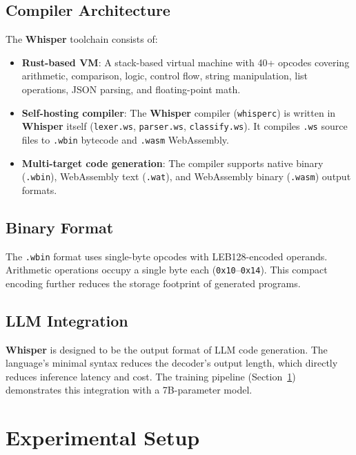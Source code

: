 \documentclass[11pt,a4paper]{article}
\begin{document}
\subsection{Compiler Architecture}

The \textbf{Whisper} toolchain consists of:

\begin{itemize}
\item \textbf{Rust-based VM}: A stack-based virtual machine with 40+ opcodes
  covering arithmetic, comparison, logic, control flow, string manipulation,
  list operations, JSON parsing, and floating-point math.
\item \textbf{Self-hosting compiler}: The \textbf{Whisper} compiler
  (\texttt{whisperc}) is written in \textbf{Whisper} itself (\texttt{lexer.ws},
  \texttt{parser.ws}, \texttt{classify.ws}). It compiles \texttt{.ws} source
  files to \texttt{.wbin} bytecode and \texttt{.wasm} WebAssembly.
\item \textbf{Multi-target code generation}: The compiler supports native
  binary (\texttt{.wbin}), WebAssembly text (\texttt{.wat}), and WebAssembly
  binary (\texttt{.wasm}) output formats.
\end{itemize}

\subsection{Binary Format}

The \texttt{.wbin} format uses single-byte opcodes with LEB128-encoded
operands. Arithmetic operations occupy a single byte each
(\texttt{0x10}--\texttt{0x14}). This compact encoding further reduces the
storage footprint of generated programs.

\subsection{LLM Integration}

\textbf{Whisper} is designed to be the output format of LLM code generation.
The language's minimal syntax reduces the decoder's output length, which
directly reduces inference latency and cost. The training pipeline
(Section~\ref{sec:experiments}) demonstrates this integration with a 7B-parameter
model.

\section{Experimental Setup}
\label{sec:experiments}
\end{document}
